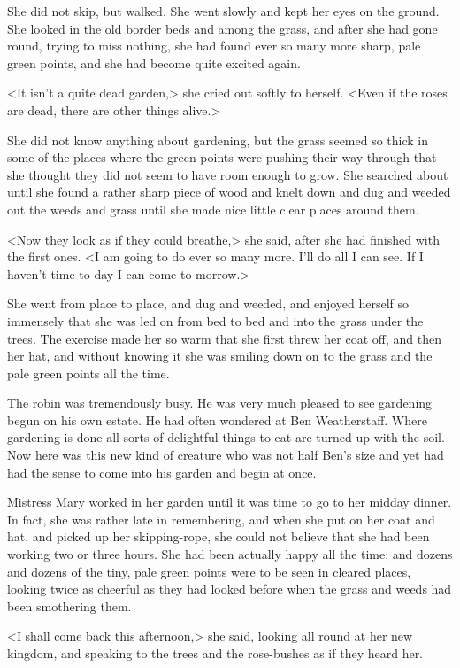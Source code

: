 She did not skip, but walked. She went slowly and kept her eyes on the ground. She looked in the old border beds and among the grass, and after she had gone round, trying to miss nothing, she had found ever so many more sharp, pale green points, and she had become quite excited again.

<It isn't a quite dead garden,> she cried out softly to herself. <Even if the roses are dead, there are other things alive.>

She did not know anything about gardening, but the grass seemed so thick in some of the places where the green points were pushing their way through that she thought they did not seem to have room enough to grow. She searched about until she found a rather sharp piece of wood and knelt down and dug and weeded out the weeds and grass until she made nice little clear places around them.

<Now they look as if they could breathe,> she said, after she had finished with the first ones. <I am going to do ever so many more. I'll do all I can see. If I haven't time to-day I can come to-morrow.>

She went from place to place, and dug and weeded, and enjoyed herself so immensely that she was led on from bed to bed and into the grass under the trees. The exercise made her so warm that she first threw her coat off, and then her hat, and without knowing it she was smiling down on to the grass and the pale green points all the time.

The robin was tremendously busy. He was very much pleased to see gardening begun on his own estate. He had often wondered at Ben Weatherstaff. Where gardening is done all sorts of delightful things to eat are turned up with the soil. Now here was this new kind of creature who was not half Ben's size and yet had had the sense to come into his garden and begin at once.

Mistress Mary worked in her garden until it was time to go to her midday dinner. In fact, she was rather late in remembering, and when she put on her coat and hat, and picked up her skipping-rope, she could not believe that she had been working two or three hours. She had been actually happy all the time; and dozens and dozens of the tiny, pale green points were to be seen in cleared places, looking twice as cheerful as they had looked before when the grass and weeds had been smothering them.

<I shall come back this afternoon,> she said, looking all round at her new kingdom, and speaking to the trees and the rose-bushes as if they heard her.

